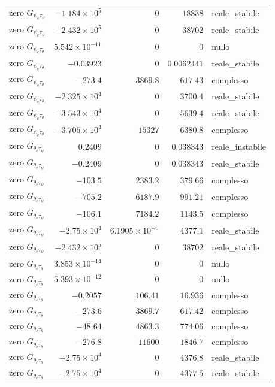\documentclass[10pt,a4paper]{article}
\numberwithin{equation}{section}
\begin{document}
\begin{longtable}{lrrrl}
zero $G_{\psi_e\tau_\psi}$ & $-1.184\times10^{5}$ & $0$ & $18838$ & reale\_stabile \\
zero $G_{\psi_e\tau_\psi}$ & $-2.432\times10^{5}$ & $0$ & $38702$ & reale\_stabile \\
\midrule
zero $G_{\psi_e\tau_\theta}$ & $5.542\times10^{-11}$ & $0$ & $0$ & nullo \\
zero $G_{\psi_e\tau_\theta}$ & $-0.03923$ & $0$ & $0.0062441$ & reale\_stabile \\
zero $G_{\psi_e\tau_\theta}$ & $-273.4$ & $3869.8$ & $617.43$ & complesso \\
zero $G_{\psi_e\tau_\theta}$ & $-2.325\times10^{4}$ & $0$ & $3700.4$ & reale\_stabile \\
zero $G_{\psi_e\tau_\theta}$ & $-3.543\times10^{4}$ & $0$ & $5639.4$ & reale\_stabile \\
zero $G_{\psi_e\tau_\theta}$ & $-3.705\times10^{4}$ & $15327$ & $6380.8$ & complesso \\
\midrule
zero $G_{\theta_e\tau_\psi}$ & $0.2409$ & $0$ & $0.038343$ & reale\_instabile \\
zero $G_{\theta_e\tau_\psi}$ & $-0.2409$ & $0$ & $0.038343$ & reale\_stabile \\
zero $G_{\theta_e\tau_\psi}$ & $-103.5$ & $2383.2$ & $379.66$ & complesso \\
zero $G_{\theta_e\tau_\psi}$ & $-705.2$ & $6187.9$ & $991.21$ & complesso \\
zero $G_{\theta_e\tau_\psi}$ & $-106.1$ & $7184.2$ & $1143.5$ & complesso \\
zero $G_{\theta_e\tau_\psi}$ & $-2.75\times10^{4}$ & $6.1905\times10^{-5}$ & $4377.1$ & reale\_stabile \\
zero $G_{\theta_e\tau_\psi}$ & $-2.432\times10^{5}$ & $0$ & $38702$ & reale\_stabile \\
\midrule
zero $G_{\theta_e\tau_\theta}$ & $3.853\times10^{-14}$ & $0$ & $0$ & nullo \\
zero $G_{\theta_e\tau_\theta}$ & $5.393\times10^{-12}$ & $0$ & $0$ & nullo \\
zero $G_{\theta_e\tau_\theta}$ & $-0.2057$ & $106.41$ & $16.936$ & complesso \\
zero $G_{\theta_e\tau_\theta}$ & $-273.6$ & $3869.7$ & $617.42$ & complesso \\
zero $G_{\theta_e\tau_\theta}$ & $-48.64$ & $4863.3$ & $774.06$ & complesso \\
zero $G_{\theta_e\tau_\theta}$ & $-276.8$ & $11600$ & $1846.7$ & complesso \\
zero $G_{\theta_e\tau_\theta}$ & $-2.75\times10^{4}$ & $0$ & $4376.8$ & reale\_stabile \\
zero $G_{\theta_e\tau_\theta}$ & $-2.75\times10^{4}$ & $0$ & $4377.5$ & reale\_stabile \\
\bottomrule\end{longtable}
\end{document}
